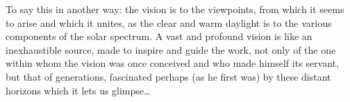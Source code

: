 To say this in another way: the vision is to the viewpoints, 
from which it seems to arise and which it unites,
as the clear and warm daylight is to the various components of the solar spectrum.
A vast and profound vision is like an inexhaustible source, made to inspire and guide the
work, not only of the one within whom the vision was once conceived and who made himself
its servant, but that of generations, fascinated perhaps (as he first was) 
by these distant horizons which it lets us glimpse\ldots

